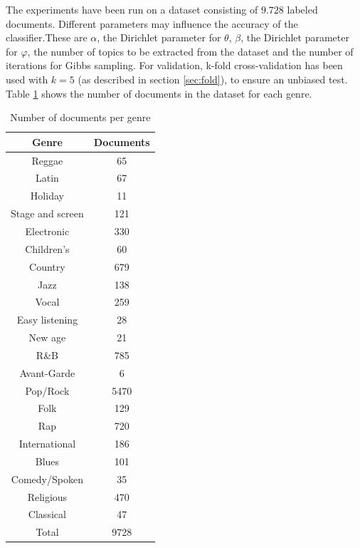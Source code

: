 
The experiments have been run on a dataset consisting of $9.728$ labeled documents. Different parameters may influence the accuracy of the classifier.These are $\alpha$, the Dirichlet parameter for $\theta$, $\beta$, the Dirichlet parameter for $\varphi$, the number of topics to be extracted from the dataset and the number of iterations for Gibbs sampling. 
For validation, k-fold cross-validation has been used with $k=5$ (as described in section \ref{sec:fold}), to ensure an unbiased test. Table \ref{table:genre_sizes} shows the number of documents in the dataset for each genre.

\begin{table}
\begin{center}
\begin{tabular}{|c|c|} 
\hline 
\textbf{Genre} & \textbf{Documents} \\
\hline
Reggae & 65 \\
\hline
Latin & 67 \\
\hline
Holiday & 11\\
\hline
Stage and screen & 121 \\
\hline 
Electronic & 330\\
\hline
Children's & 60 \\
\hline
Country & 679 \\
\hline
Jazz & 138 \\
\hline
Vocal & 259 \\
\hline
Easy listening & 28 \\
\hline
New age & 21 \\
\hline
R\&B & 785 \\
\hline
Avant-Garde & 6 \\
\hline
Pop/Rock & 5470 \\
\hline
Folk & 129 \\
\hline
Rap & 720 \\
\hline
International & 186 \\
\hline
Blues & 101 \\
\hline
Comedy/Spoken & 35 \\
\hline
Religious & 470 \\
\hline
Classical & 47 \\
\hline
Total & 9728\\
\hline
\end{tabular}
\caption{Number of documents per genre}
\label{table:genre_sizes}
\end{center}
\end{table}


